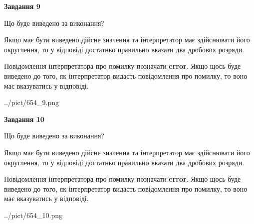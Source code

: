 \documentclass[12pt, ukrainian]{article}
\begin{document}
{\begin {Large}
{\begin {center}\textbf{Завдання 9}\end {center}}\par
Що буде виведено за виконання? \par

Якщо має бути виведено дійсне значення та інтерпретатор має здійснювати його округлення, 
то у відповіді достатньо правильно вказати два дробових розряди.

Повідомлення інтерпретатора про помилку позначати \textbf{error}.
Якщо щось буде виведено до того, як інтерпретатор видасть повідомлення про помилку, 
то воно має вказуватись у відповіді. \par

\begin{center}
	{../pict/654_9.png}
\end{center}
\newpage

{\begin {center}\textbf{Завдання 10}\end {center}}\par
Що буде виведено за виконання? \par

Якщо має бути виведено дійсне значення та інтерпретатор має здійснювати його округлення, 
то у відповіді достатньо правильно вказати два дробових розряди.

Повідомлення інтерпретатора про помилку позначати \textbf{error}.
Якщо щось буде виведено до того, як інтерпретатор видасть повідомлення про помилку, 
то воно має вказуватись у відповіді. \par

\begin{center}
	{../pict/654_10.png}
\end{center}
\newpage

\end {Large}}
\end{document}

